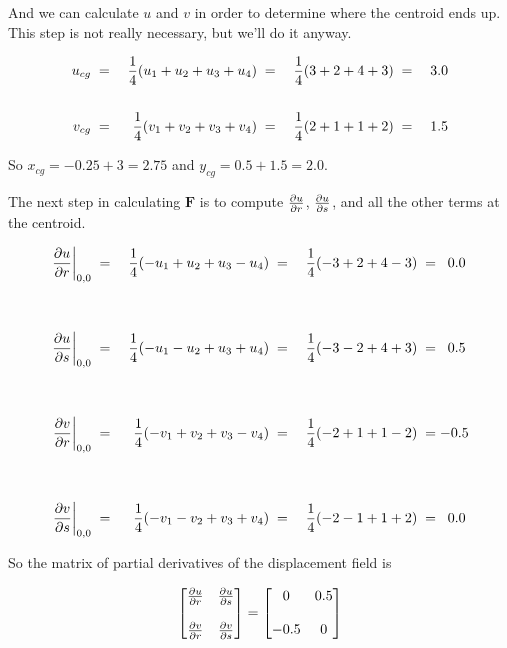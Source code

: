 And we can calculate $ u $ and $ v $ in order to determine where the centroid ends up. This step is not really necessary, but we'll do it anyway.

\begin{align*}
u_{cg} \; & = & \; {1 \over 4} (u_1 + u_2 + u_3 + u_4) \; & = & \; {1 \over 4} (3 + 2 + 4 + 3) \; & = & \; 3.0
\\
\\
v_{cg} \; & = & \; {1 \over 4} (v_1 + v_2 + v_3 + v_4) \; & = & \; {1 \over 4} (2 + 1 + 1 + 2) \; & = & \; 1.5
\end{align*}

So $ x_{cg} = -0.25 + 3 = 2.75 $ and $ y_{cg} = 0.5 + 1.5 = 2.0 $.

The next step in calculating $ \mathbf{ F} $ is to compute $ {\partial u \over \partial r} $, $ {\partial u \over \partial s} $, and all the other terms at the centroid.

\begin{align*}
\left. {\partial u \over \partial r}\right|_{0,0} \; & = & \; {1 \over 4} (-u_1 + u_2 + u_3 - u_4) \; & = & \; {1 \over 4} (-3 + 2 + 4 - 3) \; & = \;\; 0.0 \\
\\
\\
\left. {\partial u \over \partial s}\right|_{0,0} \; & = & \; {1 \over 4} (-u_1 - u_2 + u_3 + u_4) \; & = & \; {1 \over 4} (-3 - 2 + 4 + 3) \; & = \;\; 0.5 \\
\\
\\
\left. {\partial v \over \partial r}\right|_{0,0} \; & = & \; {1 \over 4} (-v_1 + v_2 + v_3 - v_4) \; & = & \; {1 \over 4} (-2 + 1 + 1 - 2) \; & = -0.5 \\
\\
\\
\left. {\partial v \over \partial s}\right|_{0,0} \; & = & \; {1 \over 4} (-v_1 - v_2 + v_3 + v_4) \; & = & \; {1 \over 4} (-2 - 1 + 1 + 2) \; & = \;\; 0.0
\end{align*}

So the matrix of partial derivatives of the displacement field is

\begin{eqnarray*}
\begin{bmatrix}
{\partial u \over \partial r} & {\partial u \over \partial s} \\
\\
{\partial v \over \partial r} & {\partial v \over \partial s} 
\end{bmatrix}
=
\begin{bmatrix}
0 & 0.5 \\
\\
-0.5 & 0 
\end{bmatrix}
\end{eqnarray*}

